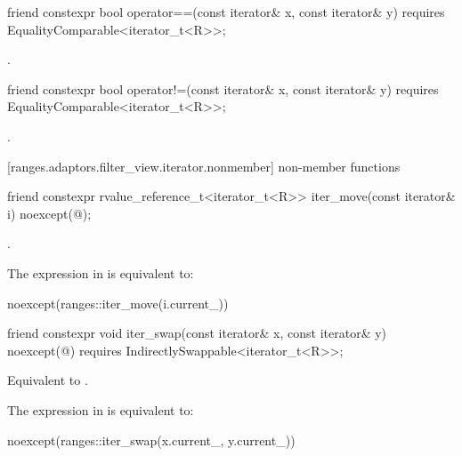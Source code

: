 %
\begin{itemdecl}
friend constexpr bool operator==(const iterator& x, const iterator& y)
requires EqualityComparable<iterator_t<R>>;
\end{itemdecl}

\begin{itemdescr}
\pnum
\returns {}.
\end{itemdescr}

%
\begin{itemdecl}
friend constexpr bool operator!=(const iterator& x, const iterator& y)
requires EqualityComparable<iterator_t<R>>;
\end{itemdecl}

\begin{itemdescr}
\pnum
\returns {}.
\end{itemdescr}

[ranges.adaptors.filter_view.iterator.nonmember]{ non-member functions}

%
\begin{itemdecl}
friend constexpr rvalue_reference_t<iterator_t<R>> iter_move(const iterator& i)
noexcept(@\seebelow@);
\end{itemdecl}

\begin{itemdescr}
\pnum
\returns {}.

\pnum
\remarks The expression in  is equivalent to:
\begin{codeblock}
noexcept(ranges::iter_move(i.current_))
\end{codeblock}
\end{itemdescr}

%
\begin{itemdecl}
friend constexpr void iter_swap(const iterator& x, const iterator& y)
noexcept(@\seebelow@) requires IndirectlySwappable<iterator_t<R>>;
\end{itemdecl}

\begin{itemdescr}
\pnum
\effects Equivalent to .

\pnum
\remarks The expression in  is equivalent to:
\begin{codeblock}
noexcept(ranges::iter_swap(x.current_, y.current_))
\end{codeblock}
\end{itemdescr}

